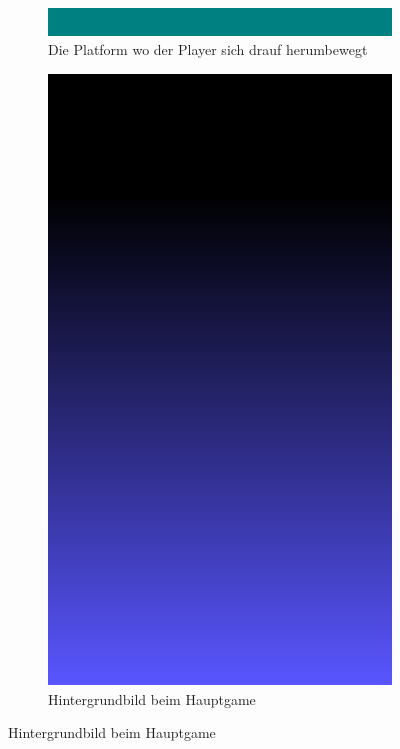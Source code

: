 \documentclass{article}
\begin{document}
\begin{figure}[ht]
\centering
\begin{subfigure}{.5\textwidth}
  \centering
  \includegraphics[width=.3\linewidth]{platform}
  \caption{Die Platform wo der Player sich drauf herumbewegt}
  \label{fig:sub1}
\end{subfigure}%
\begin{subfigure}{.5\textwidth}
  \centering
  \includegraphics[width=.3\linewidth]{sky}
  \caption{Hintergrundbild beim Hauptgame}
  \label{fig:sub2}
\end{subfigure}
\end{figure}
\end{document}
